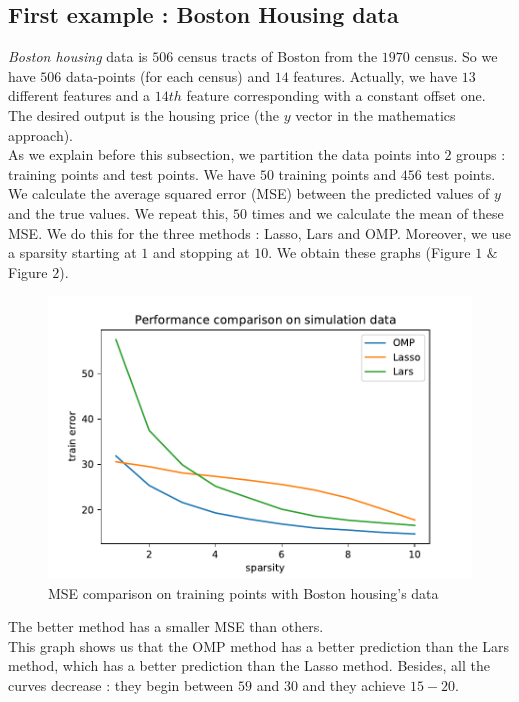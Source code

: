 \documentclass{article}
\begin{document}
\subsection{First example : Boston Housing data}
\textit{Boston housing} data is $506$ census tracts of Boston from the $1970$ census. So we have $506$ data-points (for each census) and $14$ features. Actually, we have $13$ different features and a $14th$ feature corresponding with a constant offset one. The desired output is the housing price (the $y$ vector in  the mathematics approach).\\
As we explain before this subsection, we partition the data points into $2$ groups : training points and test points. We have $50$ training points and $456$ test points. We calculate the average squared error (MSE) between the predicted values of $y$ and the true values. We repeat this, $50$ times and we calculate the mean of these MSE. We do this for the three methods : Lasso, Lars and OMP. Moreover, we use a sparsity starting at $1$ and stopping at $10$. We obtain these graphs (Figure $1$ $\&$ Figure $2$).
\begin{figure}[!ht]
    \centering
    \includegraphics[scale=0.5]{./images/training_error_housing.pdf}
    \caption{MSE comparison on training points with Boston housing's data}
    \label{Figure 1}
\end{figure}
The better method has a smaller MSE than others.\\
This graph shows us that the OMP method has a better prediction than the Lars method, which has a better prediction than the Lasso method. Besides, all the curves decrease : they begin between $59$ and $30$ and they achieve $15-20$.\\
\end{document}
